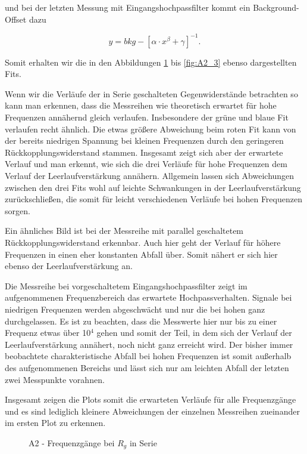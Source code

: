 \documentclass{article}
\begin{document}
und bei der letzten Messung mit Eingangshochpassfilter kommt ein Background-Offset dazu

\begin{equation}
    y = bkg - \left[ \alpha \cdot x^\beta + \gamma \right]^{-1}.
\end{equation}

Somit erhalten wir die in den Abbildungen \ref{fig:A2_1} bis \ref{fig:A2_3} ebenso dargestellten Fits.

Wenn wir die Verläufe der in Serie geschalteten Gegenwiderstände betrachten so kann man erkennen, dass die Messreihen wie theoretisch erwartet für hohe Frequenzen annähernd gleich verlaufen. Insbesondere der grüne und blaue Fit verlaufen recht ähnlich. Die etwas größere Abweichung beim roten Fit kann von der bereits niedrigen Spannung bei kleinen Frequenzen durch den geringeren Rückkopplungswiderstand stammen. Insgesamt zeigt sich aber der erwartete Verlauf und man erkennt, wie sich die drei Verläufe für hohe Frequenzen dem Verlauf der Leerlaufverstärkung annähern. Allgemein lassen sich Abweichungen zwischen den drei Fits wohl auf leichte Schwankungen in der Leerlaufverstärkung zurückschließen, die somit für leicht verschiedenen Verläufe bei hohen Frequenzen sorgen. 

Ein ähnliches Bild ist bei der Messreihe mit parallel geschaltetem Rückkopplungswiderstand erkennbar. Auch hier geht der Verlauf für höhere Frequenzen in einen eher konstanten Abfall über. Somit nähert er sich hier ebenso der Leerlaufverstärkung an.

Die Messreihe bei vorgeschaltetem Eingangshochpassfilter zeigt im aufgenommenen Frequenzbereich das erwartete Hochpassverhalten. Signale bei niedrigen Frequenzen werden abgeschwächt und nur die bei hohen ganz durchgelassen. Es ist zu beachten, dass die Messwerte hier nur bis zu einer Frequenz etwas über 10$^{4}$ gehen und somit der Teil, in dem sich der Verlauf der Leerlaufverstärkung annähert, noch nicht ganz erreicht wird. Der bisher immer beobachtete charakteristische Abfall bei hohen Frequenzen ist somit außerhalb des aufgenommenen Bereichs und lässt sich nur am leichten Abfall der letzten zwei Messpunkte vorahnen. 

Insgesamt zeigen die Plots somit die erwarteten Verläufe für alle Frequenzgänge und es sind lediglich kleinere Abweichungen der einzelnen Messreihen zueinander im ersten Plot zu erkennen. 


\begin{figure}[!b]
    \centering
    \caption{A2 - Frequenzgänge bei $R_g$ in Serie}
    \label{fig:A2_1}
\end{figure}
\end{document}

